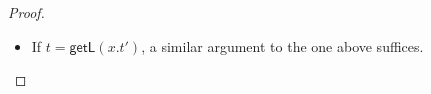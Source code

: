 \documentclass[10pt,a4paper]{amsart}
\theoremstyle{plain}
\newcommand{\getl}{\mathsf{getL}}
\newcommand{\getr}{\mathsf{getR}}
\newcommand{\corner}[1]{{\text{}^\ulcorner_\llcorner\!{#1}\!_\lrcorner^\urcorner}}
\newcommand{\asn}{\downarrow}
\newcommand{\seq}{,\!\ldots\!,}
\begin{document}
\begin{proof}
\begin{itemize}
\begin{align*}
        = (\llbracket [v_1] \rrbracket \mid \cdots \mid \llbracket [v_n] \rrbracket ) \cdot \llbracket \getr(x.t') \rrbracket
      \\&= (\llbracket [v_1] \rrbracket \mid \cdots \mid \llbracket [v_n] \rrbracket ) \cdot (1 \mid A\ulcorner) \cdot \llbracket t' \rrbracket
      = \corner{(v_1\seq v_n)} \cdot (1 \mid A\ulcorner) \cdot \llbracket t' \rrbracket
      \\&= (1 \mid A\ulcorner) \cdot \corner{(v_1 \seq v_n,1_A)} \cdot \llbracket t' \rrbracket
      = (1 \mid A\ulcorner) \cdot \llbracket \textsf{let } x_1 \seq x_n,x \asn ([v_1] \mid \cdots [v_n] \mid [x]) \textsf{ in } t' \rrbracket
      \\&= (1 \mid A\ulcorner) \cdot \llbracket t'[v_1\seq v_n,x / x_1 \seq x_n,x] \rrbracket
      = \llbracket \getr(x.t'[v_1 \seq v_n,x / x_1 \seq x_n,x]) \rrbracket
      \\&= \llbracket \getr(x.t')[v_1 \seq v_n / x_1 \seq x_n]\rrbracket
    \end{align*}
  \item If $t = \getl(x.t')$, a similar argument to the one above suffices.
  \end{itemize}
\end{proof}
\end{document}
